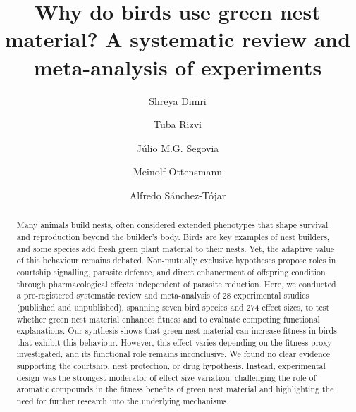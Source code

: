 \documentclass[
  number,
  review,
  onecolumn]{elsarticle}
\begin{document}
\begin{frontmatter}
\title{Why do birds use green nest material? A systematic review and
meta-analysis of experiments}
\author[1]{Shreya Dimri%
%
}
\author[1]{Tuba Rizvi%
%
}

\author[1]{Júlio M.G. Segovia%
%
}

\author[2]{Meinolf Ottensmann%
%
}

\author[1,3,4]{Alfredo Sánchez-Tójar%
%
}








        
\begin{abstract}
Many animals build nests, often considered extended phenotypes that
shape survival and reproduction beyond the builder's body. Birds are key
examples of nest builders, and some species add fresh green plant
material to their nests. Yet, the adaptive value of this behaviour
remains debated. Non-mutually exclusive hypotheses propose roles in
courtship signalling, parasite defence, and direct enhancement of
offspring condition through pharmacological effects independent of
parasite reduction. Here, we conducted a pre-registered systematic
review and meta-analysis of 28 experimental studies (published and
unpublished), spanning seven bird species and 274 effect sizes, to test
whether green nest material enhances fitness and to evaluate competing
functional explanations. Our synthesis shows that green nest material
can increase fitness in birds that exhibit this behaviour. However, this
effect varies depending on the fitness proxy investigated, and its
functional role remains inconclusive. We found no clear evidence
supporting the courtship, nest protection, or drug hypothesis. Instead,
experimental design was the strongest moderator of effect size
variation, challenging the role of aromatic compounds in the fitness
benefits of green nest material and highlighting the need for further
research into the underlying mechanisms.
\end{abstract}





\end{frontmatter}
    
\end{document}
